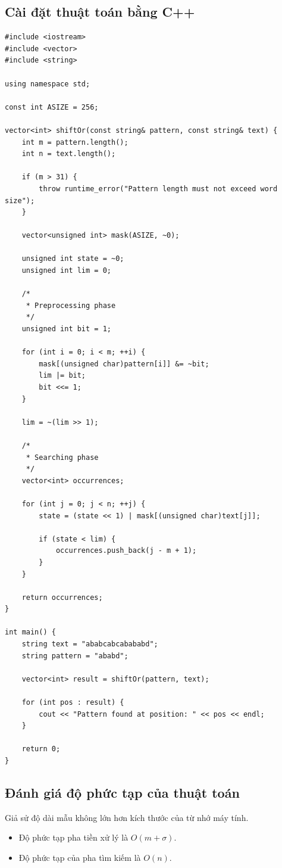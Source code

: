 \subsection{Cài đặt thuật toán bằng C++}
\begin{verbatim}
#include <iostream>
#include <vector>
#include <string>

using namespace std;

const int ASIZE = 256;

vector<int> shiftOr(const string& pattern, const string& text) {
    int m = pattern.length();
    int n = text.length();

    if (m > 31) {
        throw runtime_error("Pattern length must not exceed word size");
    }

    vector<unsigned int> mask(ASIZE, ~0);

    unsigned int state = ~0;
    unsigned int lim = 0;

    /*
     * Preprocessing phase
     */
    unsigned int bit = 1;

    for (int i = 0; i < m; ++i) {
        mask[(unsigned char)pattern[i]] &= ~bit;
        lim |= bit;
        bit <<= 1;
    }

    lim = ~(lim >> 1);

    /*
     * Searching phase
     */
    vector<int> occurrences;

    for (int j = 0; j < n; ++j) {
        state = (state << 1) | mask[(unsigned char)text[j]];

        if (state < lim) {
            occurrences.push_back(j - m + 1);
        }
    }

    return occurrences;
}

int main() {
    string text = "ababcabcabababd";
    string pattern = "ababd";

    vector<int> result = shiftOr(pattern, text);

    for (int pos : result) {
        cout << "Pattern found at position: " << pos << endl;
    }

    return 0;
}
\end{verbatim}

\subsection{Đánh giá độ phức tạp của thuật toán}
Giả sử độ dài mẫu không lớn hơn kích thước của từ nhớ máy tính.
\begin{itemize}
    \item Độ phức tạp pha tiền xử lý là $O(m + \sigma)$.
    \item Độ phức tạp của pha tìm kiếm là $O(n)$.
\end{itemize}

